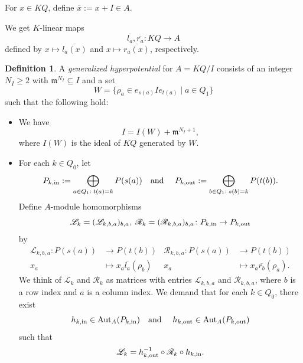 \documentclass[12pt,reqno]{amsart}
\theoremstyle{definition}
\newtheorem{Def}[Thm]{Definition}
\newcommand{\df}{\colon}
\newcommand{\scL}{{\mathscr L}}
\newcommand{\scR}{{\mathscr R}}
\newcommand{\m}{\mathfrak{m}}
\newcommand{\Aut}{\operatorname{Aut}}
\newcommand{\ov}{\overline}
\begin{document}
For $x \in KQ$, define $\ov{x} := x+I \in A$.

We get $K$-linear maps
$$
\ov{l_a}, \ov{r_a}\df KQ \to A
$$
defined by $x \mapsto \overline{l_a(x)}$ and
$x \mapsto \overline{r_a(x)}$, respectively.


\begin{Def}\label{def:genhyper}
A \emph{generalized hyperpotential} for $A = KQ/I$ consists of
an integer $N_I \geq 2$ with $\m^{N_I} \subseteq I$ and 
a set
\[
W = \{ \rho_a \in e_{s(a)}Ie_{t(a)} \mid a\in Q_1 \}
\]
such that the following hold:

\begin{itemize}\itemsep2mm

\item[(h1)] 
We have
\begin{equation}\label{eq:G1}
I = I(W) + \m^{N_I+1},
\end{equation}
where $I(W)$ is the ideal of $KQ$ generated by $W$.

\item[(h2)]
For each $k \in Q_0$, let 
\[
P_{k,{\rm in}} := \bigoplus_{a \in Q_1 : \; t(a)=k} P(s(a))
\text{\quad and \quad}
P_{k,{\rm out}} := \bigoplus_{b \in Q_1 : \; s(b)=k} P(t(b)).
\]
Define $A$-module homomorphisms
$$
\scL_k  = (\scL_{k,b,a})_{b,a},\;
\scR_k    = (\scR_{k,b,a})_{b,a}\df P_{k,{\rm in}}\to P_{k,{\rm out}}
$$ 
by
\begin{align*}
\scL_{k,b,a}\df P(s(a)) &\to P(t(b)) 
&
\scR_{k,b,a}\df P(s(a)) &\to P(t(b)) 
\\
x_a &\mapsto x_a \overline{l_a}(\rho_b)
&
x_a &\mapsto x_a \overline{r_b}(\rho_a).
\end{align*}
We think of $\scL_k$ and $\scR_k$ as matrices with entries
$\scL_{k,b,a}$ and $\scR_{k,b,a}$, where $b$ is a row index
and $a$ is a column index.
We demand that for each $k \in Q_0$, there exist
\[
h_{k,{\rm in}} \in \Aut_A(P_{k,{\rm in}})
\text{\quad and \quad}
h_{k,{\rm out}} \in \Aut_A(P_{k,{\rm out}})
\]
such that
\begin{equation}\label{eq:G2}
\scL_k = h_{k,{\rm out}}^{-1} \circ \scR_k \circ h_{k,{\rm in}}.
\end{equation}
\end{itemize}
\end{Def}
\end{document}
